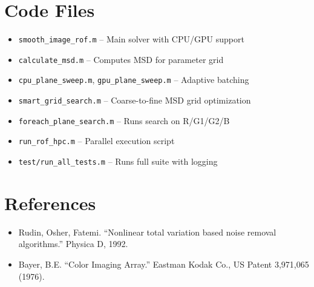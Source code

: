 \documentclass[11pt]{article}
\begin{document}
\appendix
\section*{Code Files}
\begin{itemize}
  \item \texttt{smooth\_image\_rof.m} – Main solver with CPU/GPU support
  \item \texttt{calculate\_msd.m} – Computes MSD for parameter grid
  \item \texttt{cpu\_plane\_sweep.m}, \texttt{gpu\_plane\_sweep.m} – Adaptive batching
  \item \texttt{smart\_grid\_search.m} – Coarse-to-fine MSD grid optimization
  \item \texttt{foreach\_plane\_search.m} – Runs search on R/G1/G2/B
  \item \texttt{run\_rof\_hpc.m} – Parallel execution script
  \item \texttt{test/run\_all\_tests.m} – Runs full suite with logging
\end{itemize}

\section*{References}
\begin{itemize}
  \item Rudin, Osher, Fatemi. “Nonlinear total variation based noise removal algorithms.” Physica D, 1992.
  \item Bayer, B.E. “Color Imaging Array.” Eastman Kodak Co., US Patent 3,971,065 (1976).
\end{itemize}
\end{document}
